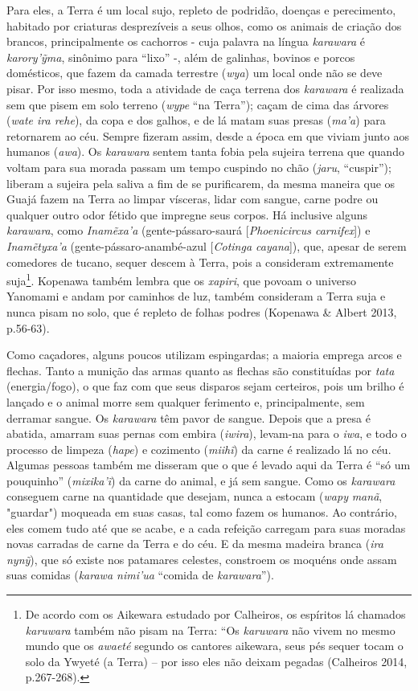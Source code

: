 Para eles, a Terra é um local sujo, repleto de podridão, doenças e
perecimento, habitado por criaturas desprezíveis a seus olhos, como os
animais de criação dos brancos, principalmente os cachorros - cuja
palavra na língua \emph{karawara} é \emph{karory'ỹma}, sinônimo para
``lixo'' -, além de galinhas, bovinos e porcos domésticos, que fazem da
camada terrestre (\emph{wya}) um local onde não se deve pisar. Por isso
mesmo, toda a atividade de caça terrena dos \emph{karawara} é realizada
sem que pisem em solo terreno (\emph{wype} ``na Terra''); caçam de cima
das árvores (\emph{wate ira rehe}), da copa e dos galhos, e de lá matam
suas presas (\emph{ma'a}) para retornarem ao céu. Sempre fizeram assim,
desde a época em que viviam junto aos humanos (\emph{awa}). Os
\emph{karawara} sentem tanta fobia pela sujeira terrena que quando
voltam para sua morada passam um tempo cuspindo no chão (\emph{jaru},
``cuspir''); liberam a sujeira pela saliva a fim de se purificarem, da
mesma maneira que os Guajá fazem na Terra ao limpar vísceras, lidar com
sangue, carne podre ou qualquer outro odor fétido que impregne seus
corpos. Há inclusive alguns \emph{karawara}, como \emph{Inamẽxa'a}
(gente-pássaro-saurá {[}\emph{Phoenicircus carnifex}{]}) e
\emph{Inamẽtyxa'a} (gente-pássaro-anambé-azul {[}\emph{Cotinga
cayana}{]}), que, apesar de serem comedores de tucano, sequer descem à
Terra, pois a consideram extremamente suja\footnote{De acordo com os
  Aikewara estudado por Calheiros, os espíritos lá chamados
  \emph{karuwara} também não pisam na Terra: ``Os \emph{karuwara} não
  vivem no mesmo mundo que os \emph{awaeté} segundo os cantores
  aikewara, seus pés sequer tocam o solo da Ywyeté (a Terra) -- por isso
  eles não deixam pegadas (Calheiros 2014, p.267-268).}. Kopenawa também
lembra que os \emph{xapiri}, que povoam o universo Yanomami e andam por
caminhos de luz, também consideram a Terra suja e nunca pisam no solo,
que é repleto de folhas podres (Kopenawa \& Albert 2013, p.56-63).

Como caçadores, alguns poucos utilizam espingardas; a maioria emprega
arcos e flechas. Tanto a munição das armas quanto as flechas são
constituídas por \emph{tata} (energia/fogo), o que faz com que seus
disparos sejam certeiros, pois um brilho é lançado e o animal morre sem
qualquer ferimento e, principalmente, sem derramar sangue. Os
\emph{karawara} têm pavor de sangue. Depois que a presa é abatida,
amarram suas pernas com embira (\emph{iwira}), levam-na para o
\emph{iwa}, e todo o processo de limpeza (\emph{hape}) e cozimento
(\emph{miihĩ}) da carne é realizado lá no céu. Algumas pessoas também me
disseram que o que é levado aqui da Terra é ``só um pouquinho''
(\emph{mixika'ĩ}) da carne do animal, e já sem sangue. Como os
\emph{karawara} conseguem carne na quantidade que desejam, nunca a
estocam (\emph{wapy} \emph{manã}, "guardar") moqueada em suas casas, tal
como fazem os humanos. Ao contrário, eles comem tudo até que se acabe, e
a cada refeição carregam para suas moradas novas carradas de carne da
Terra e do céu. E da mesma madeira branca (\emph{ira} \emph{nynỹ}), que
só existe nos patamares celestes, constroem os moquéns onde assam suas
comidas (\emph{karawa nimi'ua} ``comida de \emph{karawara}'').

